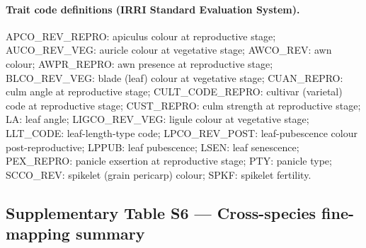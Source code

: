 \paragraph{Trait code definitions (IRRI Standard Evaluation System).}
APCO\_REV\_REPRO: apiculus colour at reproductive stage;
AUCO\_REV\_VEG: auricle colour at vegetative stage;
AWCO\_REV: awn colour;
AWPR\_REPRO: awn presence at reproductive stage;
BLCO\_REV\_VEG: blade (leaf) colour at vegetative stage;
CUAN\_REPRO: culm angle at reproductive stage;
CULT\_CODE\_REPRO: cultivar (varietal) code at reproductive stage;
CUST\_REPRO: culm strength at reproductive stage;
LA: leaf angle;
LIGCO\_REV\_VEG: ligule colour at vegetative stage;
LLT\_CODE: leaf-length-type code;
LPCO\_REV\_POST: leaf-pubescence colour post-reproductive;
LPPUB: leaf pubescence;
LSEN: leaf senescence;
PEX\_REPRO: panicle exsertion at reproductive stage;
PTY: panicle type;
SCCO\_REV: spikelet (grain pericarp) colour;
SPKF: spikelet fertility.

\clearpage

\subsection*{Supplementary Table S6 --- Cross-species fine-mapping summary}

